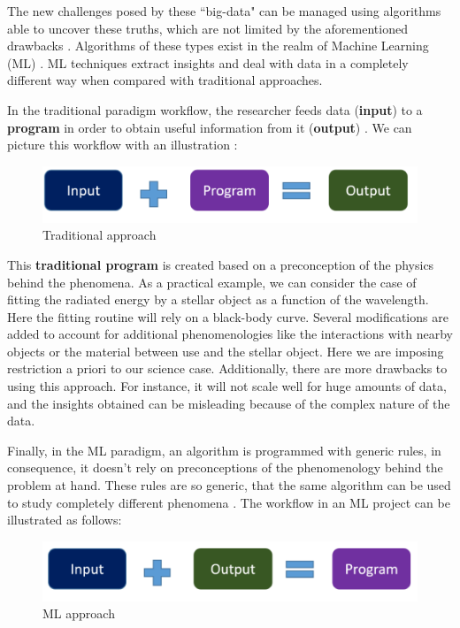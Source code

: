 The new challenges posed by these ``big-data" can be managed using algorithms able to uncover these truths, which are not limited by the aforementioned drawbacks \cite{Baron2017, Reis2019}. Algorithms of these types exist in the realm of Machine Learning (ML) \cite{IvezicBook2014, Aggarwal2017, Geron2017, Patel2019}. ML techniques extract insights and deal with data in a completely different way when compared with traditional approaches.

In the traditional paradigm workflow, the researcher feeds data (\textbf{input}) to a \textbf{program} in order to obtain useful information from it (\textbf{output}) \cite{Sriram}. We can picture this workflow with an illustration \cite{Sriram}:

\begin{figure}[h]
\centering
\includegraphics[width=100 mm]{./figures/Traditional-Programming.png}
\caption{\small{Traditional approach}}
\end{figure}

This \textbf{traditional program} is created based on a preconception of the physics behind the phenomena. As a practical example, we can consider the case of fitting the radiated energy by a stellar object as a function of the wavelength. Here the fitting routine will rely on a black-body curve. Several modifications are added to account for additional phenomenologies like the interactions with nearby objects or the material between use and the stellar object. Here we are imposing restriction a priori to our science case. Additionally, there are more drawbacks to using this approach. For instance, it will not scale well for huge amounts of data, and the insights obtained can be misleading because of the complex nature of the data.

Finally, in the ML paradigm, an algorithm is programmed with generic rules, in consequence, it doesn't rely on preconceptions of the phenomenology behind the problem at hand. These rules are so generic, that the same algorithm can be used to study completely different phenomena \cite{Sriram}. The workflow in an ML project can be illustrated as follows:

\begin{figure}[h]
\centering
\includegraphics[width=100 mm]{./figures/Machine-Learning.png}
\caption{\small{ML approach}}
\end{figure}

